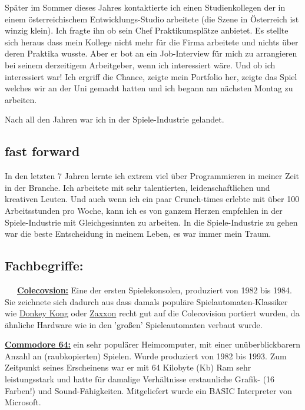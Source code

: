 \documentclass[10pt,a4paper,ngerman,twoside]{article} %
\begin{document}
\begin{multicols}{3}
Später im Sommer dieses Jahres kontaktierte ich einen Studienkollegen der in einem österreichischem Entwicklungs-Studio arbeitete (die Szene in Österreich ist winzig klein). Ich fragte ihn ob sein Chef Praktikumsplätze anbietet. Es stellte sich heraus dass mein Kollege nicht mehr für die Firma arbeitete und nichts über deren Praktika wusste. Aber er bot an ein Job-Interview für mich zu arrangieren bei seinem derzeitigem Arbeitgeber, wenn ich interessiert wäre. Und ob ich interessiert war! Ich ergriff die Chance, zeigte mein Portfolio her, zeigte das Spiel welches wir an der Uni gemacht hatten und ich begann am nächsten Montag zu arbeiten.

Nach all den Jahren war ich in der Spiele-Industrie gelandet.

\subsection*{fast forward}

In den letzten 7 Jahren lernte ich extrem viel über Programmieren in meiner Zeit in der Branche. Ich arbeitete mit sehr talentierten, leidenschaftlichen und kreativen Leuten. Und auch wenn ich ein paar Crunch-times erlebte mit über 100 Arbeitsstunden pro Woche, kann ich es von ganzem Herzen empfehlen in der Spiele-Industrie mit Gleichgesinnten zu arbeiten. In die Spiele-Industrie zu gehen war die beste Entscheidung in meinem Leben, es war immer mein Traum.

\subsection*{Fachbegriffe:}
~~~\href{https://de.wikipedia.org/wiki/Colecovision}{\textbf{Colecovsion:}} Eine der ersten Spielekonsolen, produziert von 1982 bis 1984. Sie zeichnete sich dadurch aus dass damals populäre Spielautomaten-Klassiker wie \href{https://de.wikipedia.org/wiki/Donkey_Kong}{Donkey Kong} oder \href{https://de.wikipedia.org/wiki/Zaxxon}{Zaxxon} recht gut auf die Colecovision portiert wurden, da ähnliche Hardware wie in den 'großen' Spieleautomaten verbaut wurde.

\href{https://de.wikipedia.org/wiki/Commodore_64}{\textbf{Commodore 64:}} ein sehr populärer Heimcomputer, mit einer unüberblickbarern Anzahl an (raubkopierten) Spielen. Wurde produziert von 1982 bis 1993. Zum Zeitpunkt seines Erscheinens war er mit 64 Kilobyte (Kb) Ram sehr leistungsstark und hatte für damalige Verhältnisse erstaunliche Grafik- (16 Farben!) und Sound-Fähigkeiten. Mitgeliefert wurde ein BASIC Interpreter von Microsoft.


\end{multicols}
\end{document}
